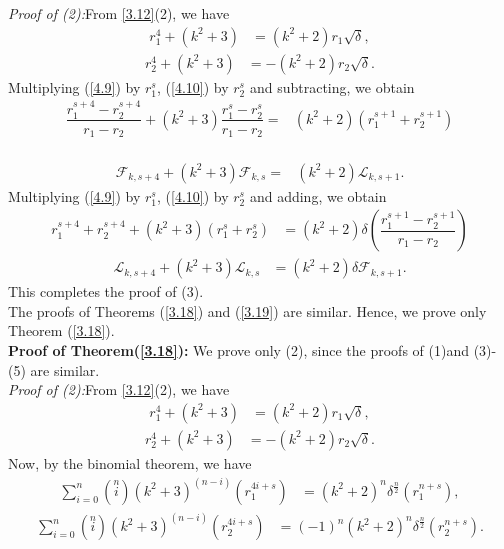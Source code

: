 \textit{Proof of (2):}From \ref{3.12}(2), we have
\begin{align}
r_1^{4}+(k^2+3)&=(k^2+2)r_1\sqrt{\delta},\label{4.9}
\end{align}
\begin{align}
r_2^{4}+(k^2+3)&=-(k^2+2)r_2\sqrt{\delta}.\label{4.10}
\end{align}
Multiplying (\ref{4.9}) by $r_1^s$, (\ref{4.10}) by $r_2^s$ and subtracting, we obtain 
\begin{align*}
\dfrac{r_1^{s+4}-r_2^{s+4}}{r_1-r_2}+(k^2+3)\dfrac{r_1^{s}-r_2^{s}}{r_1-r_2}=&(k^2+2)(r_1^{s+1}+r_2^{s+1})
\end{align*}
\\
\begin{align*}
\mathcal{F}_{k,s+4}+(k^2+3)\mathcal{F}_{k,s}=&(k^2+2)\mathcal{L}_{k,s+1}.
\end{align*}
Multiplying (\ref{4.9}) by $r_1^s$, (\ref{4.10}) by $r_2^s$ and adding, we obtain
\begin{align*}
r_1^{s+4}+r_2^{s+4}+(k^2+3)(r_1^{s}+r_2^{s})&=(k^2+2)\delta(\dfrac{r_1^{s+1}-r_2^{s+1}}{r_1-r_2})
\end{align*}
\begin{align*}
\mathcal{L}_{k,s+4}+(k^2+3)\mathcal{L}_{k,s}&=(k^2+2)\delta\mathcal{F}_{k,s+1}.
\end{align*}
This completes the proof of (3).\\
The proofs of Theorems (\ref{3.18}) and (\ref{3.19}) are similar. Hence, we prove only Theorem (\ref{3.18}).\\
\textbf{Proof of Theorem(\ref{3.18}):} We prove only (2), since the proofs of (1)and (3)-(5) are similar.\\
\textit{Proof of (2):}From \ref{3.12}(2), we have
\begin{align*}
r_1^{4}+(k^2+3)&=(k^2+2)r_1\sqrt{\delta},
\end{align*}
\begin{align*}
r_2^{4}+(k^2+3)&=-(k^2+2)r_2\sqrt{\delta}.
\end{align*}
Now, by the binomial theorem, we have
\begin{align}\label{4.11}
\sum\limits_{i=0}^{n}\left( \stackrel{n}{i}\right)(k^2+3)^{(n-i)}(r_1^{4i+s})&=(k^2+2)^n\delta^{\frac{n}{2}}(r_1^{n+s}), 
\end{align}
\begin{align}\label{4.12}
\sum\limits_{i=0}^{n}\left( \stackrel{n}{i}\right)(k^2+3)^{(n-i)}(r_2^{4i+s})&=(-1)^n(k^2+2)^n\delta^{\frac{n}{2}}(r_2^{n+s}).
\end{align}
